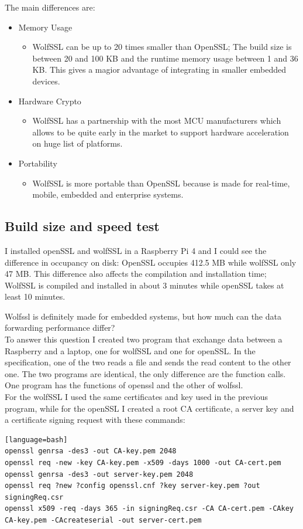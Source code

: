 \documentclass[a4paper,12pt]{article}
\begin{document}
The main differences are:
\begin{itemize}
\item Memory Usage
\begin{itemize}
\item WolfSSL can be up to 20 times smaller than OpenSSL; The build size is between 20 and 100 KB and the runtime memory usage between 1 and 36 KB. This gives a magior advantage of integrating in smaller embedded devices. 
\end{itemize}
\item Hardware Crypto
\begin{itemize}
\item WolfSSL has a partnership with the most MCU manufacturers which allows to be quite early in the market to support hardware acceleration on huge list of platforms.
\end{itemize}
\item Portability
\begin{itemize}
\item WolfSSL is more portable than OpenSSL because is made for real-time, mobile, embedded and enterprise systems.
\end{itemize}
\end{itemize}

\subsection{Build size and speed test}
I installed openSSL and wolfSSL in a Raspberry Pi 4 and I could see the difference in occupancy on disk:
OpenSSL occupies 412.5 MB while wolfSSL only 47 MB. This difference also affects the compilation and installation time; WolfSSL is compiled and installed in about 3 minutes while openSSL takes at least 10 minutes.

Wolfssl is definitely made for embedded systems, but how much can the data forwarding performance differ?
\\To answer this question I created two program that exchange data between a Raspberry and a laptop, one for wolfSSL and one for openSSL. In the specification, one of the two reads a file and sends the read content to the other one.
The two programs are identical, the only difference are the function calls. One program has the functions of openssl and the other of wolfssl.
\\For the wolfSSL I used the same certificates and key used in the previous program, while for the openSSL I created a root CA certificate, a server key and a certificate signing request with these commands:
\begin{lstlisting}[caption={openSSL commands},captionpos=b][language=bash]
openssl genrsa -des3 -out CA-key.pem 2048
openssl req -new -key CA-key.pem -x509 -days 1000 -out CA-cert.pem
openssl genrsa -des3 -out server-key.pem 2048
openssl req ?new ?config openssl.cnf ?key server-key.pem ?out signingReq.csr
openssl x509 -req -days 365 -in signingReq.csr -CA CA-cert.pem -CAkey CA-key.pem -CAcreateserial -out server-cert.pem
\end{lstlisting}
\end{document}
